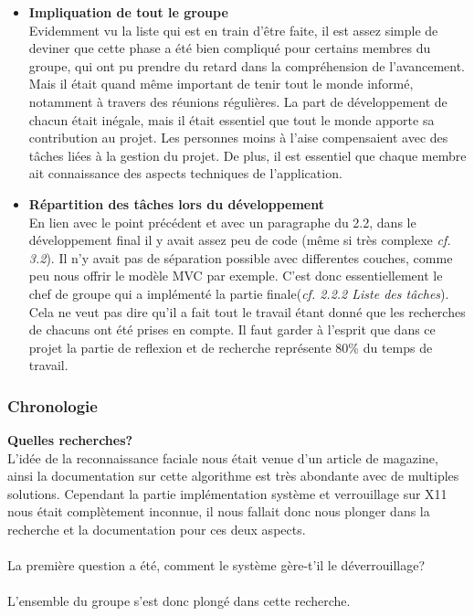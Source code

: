 \documentclass[french]{report}
\begin{document}
\begin{itemize}[label=\textbullet, font=\normalfont \color{blue}]
  \item{\textbf{Impliquation de tout le groupe}}\\
Evidemment vu la liste qui est en train d'être faite, il est assez simple de deviner
que cette phase a été bien compliqué pour certains membres du groupe, qui ont pu
prendre du retard dans la compréhension de l'avancement. Mais il était quand même
important de tenir tout le monde informé, notamment à travers des réunions régulières.
La part de développement de chacun était inégale, mais il était essentiel que
tout le monde apporte sa contribution au projet. Les personnes moins à l'aise
compensaient avec des tâches liées à la gestion du projet. De plus, il est essentiel que chaque membre ait
connaissance des aspects techniques de l'application.\\

  \item{\textbf{Répartition des tâches lors du développement}}\\
En lien avec le point précédent et avec un paragraphe du 2.2, dans le développement
final il y avait assez peu de code (même si très complexe \emph{cf. 3.2}). Il n'y avait pas de
séparation possible avec differentes couches, comme peu nous offrir le modèle MVC
par exemple. C'est donc essentiellement le chef de groupe qui a implémenté la partie
finale(\emph{cf. 2.2.2 Liste des tâches}). Cela ne veut pas dire qu'il a fait tout
le travail étant donné que les recherches de chacuns ont été prises en compte. Il
faut garder à l'esprit que dans ce projet la partie de reflexion et de recherche
représente 80\% du temps de travail.\\

\end{itemize}

\subsubsection{Chronologie}

\vspace{0.5cm}
\textbf{Quelles recherches?}\\

  L’idée de la reconnaissance faciale nous était venue d’un article de magazine,
  ainsi la documentation sur cette algorithme est très abondante avec de
  multiples solutions. Cependant la partie implémentation système et
  verrouillage sur X11 nous était complètement inconnue, il nous fallait donc
  nous plonger dans la recherche et la documentation pour ces deux aspects.
\\ \\
  La première question a été, comment le système gère-t’il le déverrouillage?
\\ \\
  L’ensemble du groupe s’est donc plongé dans cette recherche.
\end{document}
